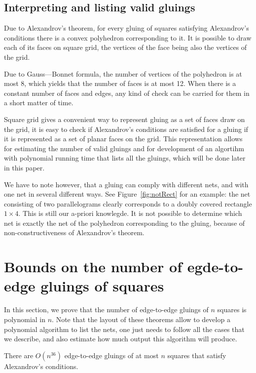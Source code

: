 \documentclass[a4paper,11pt]{article}
\begin{document}
\subsection{Interpreting and listing valid gluings}

Due to Alexandrov's theorem, for every gluing of squares satisfying Alexandrov's conditions there is a convex polyhedron corresponding to it. It is possible to draw each of its faces on square grid, the vertices of the face being also the vertices of the grid.

Due to Gauss—Bonnet formula, the number of vertices of the polyhedron is at most 8, which yields that the number of faces is at most 12. When there is a constant number of faces and edges, any kind of check can be carried for them in a short matter of time.

Square grid gives a convenient way to represent gluing as a set of faces draw on the grid, it is easy to check if Alexandrov's conditions are satisfied for a gluing if it is represented as a set of planar faces on the grid. This representation allows for estimating the number of valid gluings and for development of an algortihm with polynomial running time that lists all the gluings, which will be done later in this paper.

We have to note however, that a gluing can comply with different nets, and with one net in several different ways. See Figure~\ref{fig:notRect} for an example: the net consisting of two parallelograms clearly corresponds to a doubly covered rectangle $1 \times 4$. This is still our a-priori knowlegde. It is not possible to determine which net is exactly the net of the polyhedron corresponding to the gluing, because of non-constructiveness of Alexandrov's theorem.



\section{Bounds on the number of egde-to-edge gluings of squares}

In this section, we prove that the number of edge-to-edge gluings of $n$ squares is polynomial in $n$. Note that the layout of these theorems allow to develop a polynomial algorithm to list the nets, one just needs to follow all the cases that we describe, and also estimate how much output this algorithm will produce.

\begin{theorem} \label{thm:n36}
	There are $O \left( n^{36} \right)$ edge-to-edge gluings of at most $n$ squares that satisfy Alexandrov's conditions.
\end{theorem}
\end{document}
